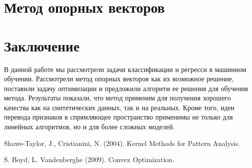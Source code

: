 \documentclass[twoside,twocolumn]{article}
\theoremstyle{plain}
\theoremstyle{definition}
\begin{document}
\section{Метод опорных векторов}


\section{Заключение}
В данной работе мы рассмотрели задачи классификации и регресси в машинном обучении. Рассмотрели метод опорных векторов как их возможное решение, поставили задачу
оптимизации и предложили алгоритм ее решения для обучения метода. Результаты показали, что метод применим для получения хорошего качества как на синтетических
данных, так и на реальных. Кроме того, идеи перевода признаков в спрямляющее пространство применимы не только для линейных алгоритмов, но и для более сложных
моделей.



\begin{thebibliography}{99} %

Shawe-Taylor, J., Cristianini, N. (2004).
\newblock Kernel Methods for Pattern Analysis.

S. Boyd, L. Vandenberghe (2009).
\newblock Convex Optimization.
 
\end{thebibliography}

\end{document}
